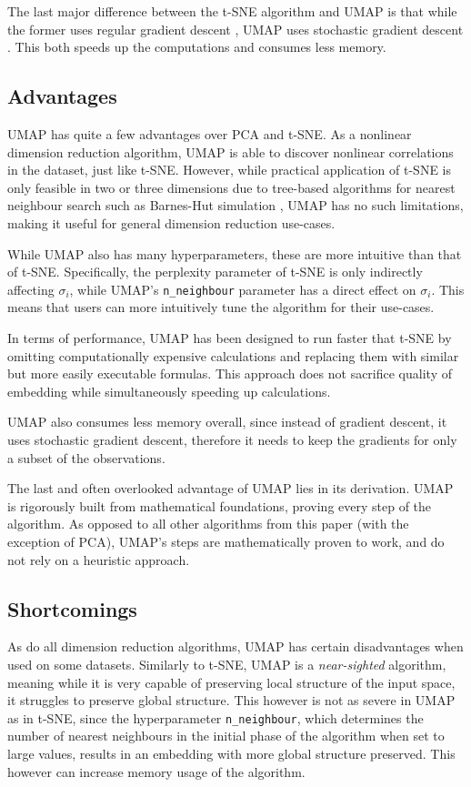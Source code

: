 The last major difference between the t-SNE algorithm and UMAP is that while the former uses regular gradient descent \cite{bib:gd}, UMAP uses stochastic gradient descent \cite{bib:sgd}. This both speeds up the computations and consumes less memory.

\subsection{Advantages}

UMAP has quite a few advantages over PCA and t-SNE. As a nonlinear dimension reduction algorithm, UMAP is able to discover nonlinear correlations in the dataset, just like t-SNE. However, while practical application of t-SNE is only feasible in two or three dimensions due to tree-based algorithms for nearest neighbour search such as Barnes-Hut simulation \cite{bib:barnes-hut}, UMAP has no such limitations, making it useful for general dimension reduction use-cases.

While UMAP also has many hyperparameters, these are more intuitive than that of t-SNE. Specifically, the perplexity parameter of t-SNE is only indirectly affecting $\sigma_i$, while UMAP's \texttt{n\_neighbour} parameter has a direct effect on $\sigma_i$. This means that users can more intuitively tune the algorithm for their use-cases.

In terms of performance, UMAP has been designed to run faster that t-SNE by omitting computationally expensive calculations and replacing them with similar but more easily executable formulas. This approach does not sacrifice quality of embedding while simultaneously speeding up calculations.

UMAP also consumes less memory overall, since instead of gradient descent, it uses stochastic gradient descent, therefore it needs to keep the gradients for only a subset of the observations.

The last and often overlooked advantage of UMAP lies in its derivation. UMAP is rigorously built from mathematical foundations, proving every step of the algorithm. As opposed to all other algorithms from this paper (with the exception of PCA), UMAP's steps are mathematically proven to work, and do not rely on a heuristic approach.

\subsection{Shortcomings}

As do all dimension reduction algorithms, UMAP has certain disadvantages when used on some datasets. Similarly to t-SNE, UMAP is a \textit{near-sighted} algorithm, meaning while it is very capable of preserving local structure of the input space, it struggles to preserve global structure. This however is not as severe in  UMAP as in t-SNE, since the hyperparameter \texttt{n\_neighbour}, which determines the number of nearest neighbours in the initial phase of the algorithm when set to large values, results in an embedding with more global structure preserved. This however can increase memory usage of the algorithm.

